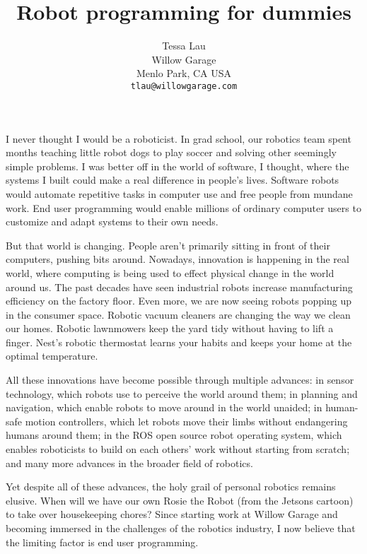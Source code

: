 \documentclass{article}
\begin{document}
\title {Robot programming for dummies}
\author {Tessa Lau \\
Willow Garage \\
Menlo Park, CA USA \\
{\tt tlau@willowgarage.com}
}
\maketitle

I never thought I would be a roboticist. In grad school, our robotics team spent months teaching little robot dogs to play soccer and solving other seemingly simple problems. I was better off in the world of software, I thought, where the systems I built could make a real difference in people's lives. Software robots would automate repetitive tasks in computer use and free people from mundane work. End user programming would enable millions of ordinary computer users to customize and adapt systems to their own needs.

But that world is changing. People aren't primarily sitting in front of their computers, pushing bits around. Nowadays, innovation is happening in the real world, where computing is being used to effect physical change in the world around us. The past decades have seen industrial robots increase manufacturing efficiency on the factory floor. Even more, we are now seeing robots popping up in the consumer space. Robotic vacuum cleaners are changing the way we clean our homes. Robotic lawnmowers keep the yard tidy without having to lift a finger. Nest's robotic thermostat learns your habits and keeps your home at the optimal temperature.

All these innovations have become possible through multiple advances: in sensor technology, which robots use to perceive the world around them; in planning and navigation, which enable robots to move around in the world unaided; in human-safe motion controllers, which let robots move their limbs without endangering humans around them; in the ROS open source robot operating system, which enables roboticists to build on each others' work without starting from scratch; and many more advances in the broader field of robotics.

Yet despite all of these advances, the holy grail of personal robotics remains elusive. When will we have our own Rosie the Robot (from the Jetsons cartoon) to take over housekeeping chores? Since starting work at Willow Garage and becoming immersed in the challenges of the robotics industry, I now believe that the limiting factor is end user programming.
\end{document}
